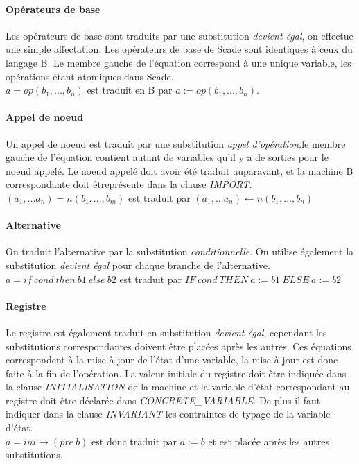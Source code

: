 \paragraph{Opérateurs de base}
Les opérateurs de base sont traduits par une substitution \emph{devient égal}, on
effectue une simple affectation. Les opérateurs de base de Scade sont identiques
à ceux du langage B. Le membre gauche de l'équation correspond à une unique
variable, les opérations étant atomiques dans Scade. \\
$a = op(b_1,...,b_n)$ est traduit en B par $a:=op(b_1,...,b_n)$. 

\paragraph{Appel de noeud}
Un appel de noeud est traduit par une substitution \emph{appel d'opération}.le
membre gauche de l'équation contient autant de variables qu'il y a de sorties
pour le noeud appelé. Le noeud appelé doit avoir été traduit auparavant, et la
machine B correspondante doit êtreprésente dans la clause \emph{IMPORT}.
$(a_1, ... a_n) = n(b_1, ..., b_m)$ est traduit par $(a_1, ... a_n) \leftarrow n(b_1,
..., b_n)$

\paragraph{Alternative}
On traduit l'alternative par la substitution \emph{conditionnelle}. On utilise
également la substitution \emph{devient égal} pour chaque branche de l'alternative.
$ a = if~ cond~ then~ b1~ else~ b2$ est traduit par $IF ~cond~ THEN ~a:=b1~ ELSE
~a:=b2$

\paragraph{Registre}
Le registre est également traduit en substitution \emph{devient égal}, cependant
les substitutions correspondantes doivent être placées après les autres. Ces
équations correspondent à la mise à jour de l'état d'une variable, la mise à
jour est donc faite à la fin de l'opération. La valeur initiale du registre doit
être indiquée dans la clause \emph{INITIALISATION} de la machine et la variable d'état
correspondant au registre doit être déclarée dans \emph{CONCRETE\_VARIABLE}. De
plus il faut indiquer dans la clause \emph{INVARIANT} les contraintes de typage
de la variable d'état. \\
$a = ini \rightarrow (pre ~b)$ est donc traduit par $a := b$ et est placée après les
autres substitutions.

